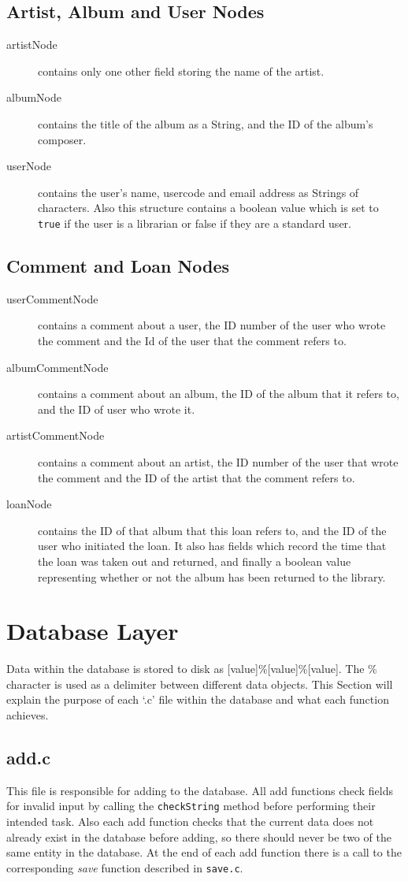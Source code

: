 \documentclass{article}
\begin{document}
\subsection{Artist, Album and User Nodes}
\begin{description}
\item[artistNode]  contains only one other field storing the name of the artist.
\item[albumNode] contains the title of the album as a String, and the ID of the album's composer.
\item[userNode] contains the user's name, usercode and email address as Strings of characters. Also this structure contains a boolean value which is set to \verb|true| if the user is a librarian or false if they are a standard user.
\end{description}
\subsection{Comment and Loan Nodes}
\begin{description}
\item[userCommentNode] contains a comment about a user, the ID number of the user who wrote the comment and the Id of the user that the comment refers to.
\item[albumCommentNode] contains a comment about an album, the ID of the album that it refers to, and the ID of user who wrote it.
\item[artistCommentNode] contains a comment about an artist, the ID number of the user that wrote the comment and the ID of the artist that the comment refers to.
\item[loanNode] contains the ID of that album that this loan refers to, and the ID of the user who initiated the loan. It also has fields which record the time that the loan was taken out and returned, and finally a boolean value representing whether or not the album has been returned to the library.
\end{description}


\section{Database Layer}
Data within the database is stored to disk as [value]\%[value]\%[value]. The \% character is used as a delimiter between different data objects. This Section will explain the purpose of each `.c' file within the database and what each function achieves.
\subsection{add.c}
This file is responsible for adding to the database. All add functions check fields for invalid input by calling the \verb|checkString| method before performing their intended task. Also each add function checks that the current data does not already exist in the database before adding, so there should never be two of the same entity in the database. At the end of each add function there is a call to the corresponding \emph{save} function described in \verb|save.c|.
\end{document}
